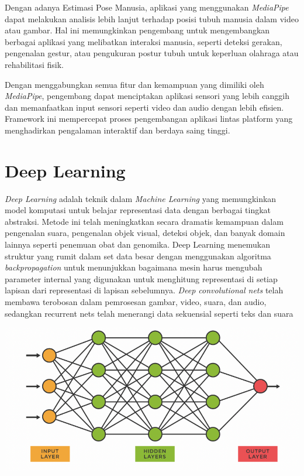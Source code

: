 Dengan adanya Estimasi Pose Manusia, aplikasi yang menggunakan \textit{MediaPipe} dapat melakukan analisis lebih lanjut terhadap posisi tubuh manusia dalam video atau gambar. Hal ini memungkinkan pengembang untuk mengembangkan berbagai aplikasi yang melibatkan interaksi manusia, seperti deteksi gerakan, pengenalan gestur, atau pengukuran postur tubuh untuk keperluan olahraga atau rehabilitasi fisik.

Dengan menggabungkan semua fitur dan kemampuan yang dimiliki oleh \textit{MediaPipe}, pengembang dapat menciptakan aplikasi sensori yang lebih canggih dan memanfaatkan input sensori seperti video dan audio dengan lebih efisien. Framework ini mempercepat proses pengembangan aplikasi lintas platform yang menghadirkan pengalaman interaktif dan berdaya saing tinggi. \cite{singh2021real}

\section{Deep Learning}
\textit{Deep Learning} adalah teknik dalam \textit{Machine Learning} yang memungkinkan model komputasi untuk belajar representasi data dengan berbagai tingkat abstraksi. Metode ini telah meningkatkan secara dramatis kemampuan dalam pengenalan suara, pengenalan objek visual, deteksi objek, dan banyak domain lainnya seperti penemuan obat dan genomika. Deep Learning menemukan struktur yang rumit dalam set data besar dengan menggunakan algoritma \textit{backpropagation} untuk menunjukkan bagaimana mesin harus mengubah parameter internal yang digunakan untuk menghitung representasi di setiap lapisan dari representasi di lapisan sebelumnya. \textit{Deep convolutional nets} telah membawa terobosan dalam pemrosesan gambar, video, suara, dan audio, sedangkan recurrent nets telah menerangi data sekuensial seperti teks dan suara \cite{patterson2017deep}

\begin{center}
	\includegraphics[width=0.7\linewidth]{gambar/bener/ArsitekturDeeplearning.png}
	\label{fig:Deep Learning secara umum}
\end{center}  

